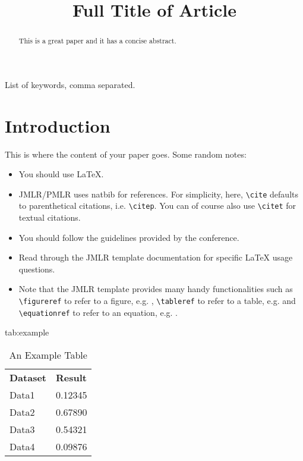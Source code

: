 \documentclass{midl} %
\title[Short Title]{Full Title of Article}
\begin{document}
\maketitle

\begin{abstract}
This is a great paper and it has a concise abstract.
\end{abstract}

\begin{keywords}
List of keywords, comma separated.
\end{keywords}

\section{Introduction}

This is where the content of your paper goes.  Some random notes:
\begin{itemize}
\item You should use \LaTeX \cite{Lamport:Book:1989}.
\item JMLR/PMLR uses natbib for references. For simplicity, here, \verb|\cite|  defaults to
  parenthetical citations, i.e. \verb|\citep|. You can of course also
  use \verb|\citet| for textual citations.
\item You should follow the guidelines provided by the conference.
\item Read through the JMLR template documentation for specific \LaTeX
  usage questions.
\item Note that the JMLR template provides many handy functionalities
such as \verb|\figureref| to refer to a figure,
e.g. ,  \verb|\tableref| to refer to a table,
e.g.  and \verb|\equationref| to refer to an equation,
e.g. .
\end{itemize}

\begin{table}[htbp]
\floatconts
  {tab:example}%
  {\caption{An Example Table}}%
  {\begin{tabular}{ll}
  \bfseries Dataset & \bfseries Result\\
  Data1 & 0.12345\\
  Data2 & 0.67890\\
  Data3 & 0.54321\\
  Data4 & 0.09876
  \end{tabular}}
\end{table}
\end{document}
